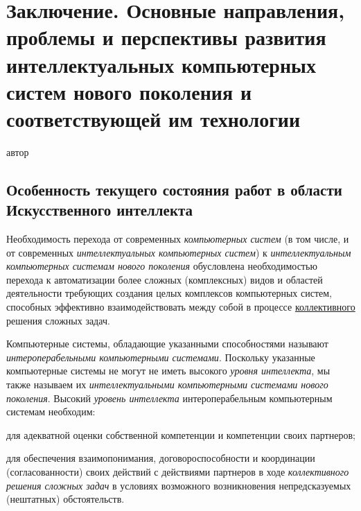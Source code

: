 \chapter*{\LARGE Заключение. Основные направления, проблемы и перспективы развития интеллектуальных компьютерных систем нового поколения и соответствующей им технологии}
\label{chap_conclusion}

\begin{SCn}
	\begin{scnrelfromlist}{автор}
	\end{scnrelfromlist}
\end{SCn}

\section*{Особенность текущего состояния работ в области Искусственного интеллекта}

Необходимость перехода от современных \textit{компьютерных систем} (в том числе, и от современных \textit{интеллектуальных компьютерных систем}) к \textit{интеллектуальным компьютерных системам нового поколения} обусловлена необходимостью перехода к автоматизации более сложных (комплексных) видов и областей деятельности требующих создания целых комплексов компьютерных систем, способных эффективно взаимодействовать между собой в процессе \uline{коллективного} решения сложных задач.

Компьютерные системы, обладающие указанными способностями называют \textit{интероперабельными компьютерными системами}. Поскольку указанные компьютерные системы не могут не иметь высокого \textit{уровня интеллекта}, мы также называем их \textit{интеллектуальными компьютерными системами нового поколения}. Высокий \textit{уровень интеллекта} интероперабельным компьютерным системам необходим:

\begin{textitemize}
	\item для адекватной оценки собственной компетенции и компетенции своих партнеров;
	\item для обеспечения взаимопонимания, договороспособности и координации (согласованности) своих действий с действиями партнеров в ходе \textit{коллективного решения сложных задач} в условиях возможного возникновения непредсказуемых (нештатных) обстоятельств.
\end{textitemize}

